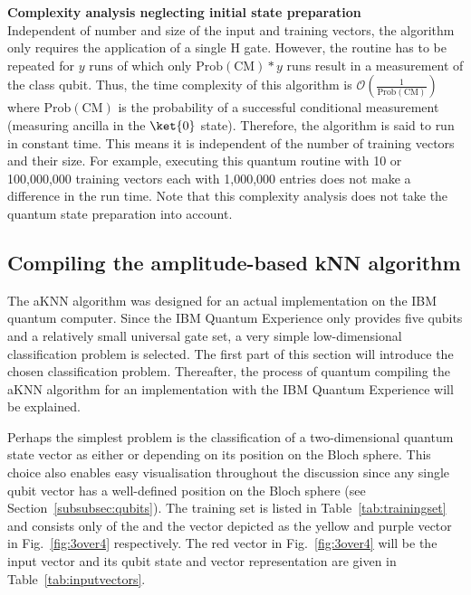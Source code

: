 \begin{greenbox}
\textbf{Complexity analysis neglecting initial state preparation}\\
\newline
Independent of number and size of the input and training vectors, the algorithm only requires the application of a single H gate. However, the routine has to be repeated for $y$ runs of which only $\mathrm{Prob(CM)}*y$ runs result in a measurement of the class qubit. Thus, the time complexity of this algorithm is $\mathcal{O}(\frac{1}{\mathrm{Prob(CM)}})$ where $\mathrm{Prob(CM)}$ is the probability of a successful conditional measurement (measuring ancilla in the $\ket{0}$ state). Therefore, the algorithm is said to run in constant time. This means it is independent of the number of training vectors and their size. For example, executing this quantum routine with 10 or 100,000,000 training vectors each with 1,000,000 entries does not make a difference in the run time. Note that this complexity analysis does not take the quantum state preparation into account. 
\end{greenbox}

\subsection{Compiling the amplitude-based kNN algorithm}
\label{subsubsec:implementationamplitudeKNN}
The aKNN algorithm was designed for an actual implementation on the IBM quantum computer. Since the IBM Quantum Experience only provides five qubits and a relatively small universal gate set, a very simple low-dimensional classification problem is selected. The first part of this section will introduce the chosen classification problem. Thereafter, the process of quantum compiling the aKNN algorithm for an implementation with the IBM Quantum Experience will be explained.

Perhaps the simplest problem is the classification of a two-dimensional quantum state vector as either \0 or \1 depending on its position on the Bloch sphere. This choice also enables easy visualisation throughout the discussion since any single qubit vector has a well-defined position on the Bloch sphere (see Section~\ref{subsubsec:qubits}). The training set is listed in Table~\ref{tab:trainingset} and consists only of the \0 and the \1 vector depicted as the yellow and purple vector in Fig.~\ref{fig:3over4} respectively. The red vector in Fig.~\ref{fig:3over4} will be the input vector and its qubit state and vector representation are given in Table~\ref{tab:inputvectors}.

